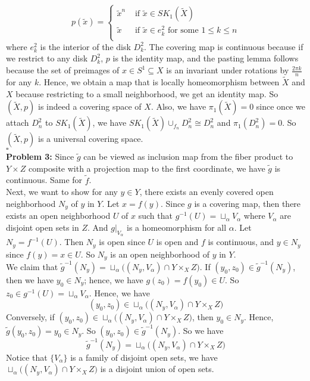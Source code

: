 \documentclass[12pt]{amsart}
\begin{document}
\[p(\tilde{x})=\begin{cases}
    \tilde{x}^n & \text{ if } \tilde{x}\in SK_1(\tilde{X})\\
    \tilde{x} & \text{ if }\tilde{x}\in e^2_k \text{ for some }1\leq k\leq n\\ 
\end{cases}\]
where $e^2_k$ is the interior of the disk $D^2_k$. The covering map is continuous because if we restrict to any disk $D^2_k$, $p$ is the identity map, and the pasting lemma follows because the set of preimages of $x\in S^1\subseteq X$ is an invariant under rotations by $\frac{2\pi k}{n}$ for any $k$. Hence, we obtain a map that is locally homeomorphism between $\tilde{X}$ and $X$ because restricting to a small neighborhood, we get an identity map. So $(\tilde{X},p)$ is indeed a covering space of $X$. Also, we have $\pi_1(\tilde{X})=0$ since once we attach $D^2_n$ to $SK_1(\tilde{X})$, we have $SK_1(\tilde{X})\cup_{f_n} D^2_n\cong D^2_n$ and $\pi_1(D^2_n)=0$. So $(\tilde{X},p)$ is a universal covering space.
\\\phantom{qed}\hfill$\square$\\
\textbf{Problem 3:} Since $\tilde{g}$ can be viewed as inclusion map from the fiber product to $Y\times Z$ composite with a projection map to the first coordinate, we have $\tilde{g}$ is continuous. Same for $\tilde{f}$.\\
Next, we want to show for any $y\in Y$, there exists an evenly covered open neighborhood $N_y$ of $y$ in $Y$. Let $x=f(y)$. Since $g$ is a covering map, then there exists an open neighborhood $U$ of $x$ such that $g^{-1}(U)=\sqcup_\alpha V_\alpha$ where $V_\alpha$ are disjoint open sets in $Z$. And $g|_{V_\alpha}$ is a homeomorphism for all $\alpha$. Let $N_y=f^{-1}(U)$. Then $N_y$ is open since $U$ is open and $f$ is continuous, and $y\in N_y$ since $f(y)=x\in U$. So $N_y$ is an open neighborhood of $y$ in $Y$.\\ 
We claim that $\tilde{g}^{-1}(N_y)=\sqcup_\alpha \big((N_y,V_\alpha)\cap Y\times_X Z\big)$. If $(y_0,z_0)\in \tilde{g}^{-1}(N_y)$, then we have $y_0\in N_y$; hence, we have $g(z_0)=f(y_0)\in U$. So $z_0\in g^{-1}(U)=\sqcup_\alpha V_\alpha$. Hence, we have 
\[(y_0,z_0)\in \sqcup_\alpha \big((N_y,V_\alpha)\cap Y\times_X Z\big)\]
Conversely, if $(y_0,z_0)\in \sqcup_\alpha \big((N_y,V_\alpha)\cap Y\times_X Z\big)$, then $y_0\in N_y$. Hence, $\tilde{g}(y_0,z_0)=y_0\in N_y$. So $(y_0,z_0)\in \tilde{g}^{-1}(N_y)$. So we have 
\[\tilde{g}^{-1}(N_y)=\sqcup_\alpha \big((N_y,V_\alpha)\cap Y\times_X Z\big)\] Notice that $\{V_\alpha\}$ is a family of disjoint open sets, we have $\sqcup_\alpha \big((N_y,V_\alpha)\cap Y\times_X Z\big)$ is a disjoint union of open sets.\\
\end{document}
